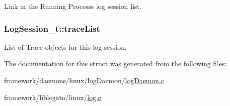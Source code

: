Link in the Running Process\textquotesingle{}s log session list. 

\subsubsection[{\texorpdfstring{trace\+List}{traceList}}]{ Log\+Session\+\_\+t\+::trace\+List}\hypertarget{struct_log_session__t_a2ca5fa6e4005f1b06f3c6f07f7f1e3dc}{}\label{struct_log_session__t_a2ca5fa6e4005f1b06f3c6f07f7f1e3dc}


List of Trace objects for this log session. 



The documentation for this struct was generated from the following files\+:\begin{DoxyCompactItemize}
\item 
framework/daemons/linux/log\+Daemon/\hyperlink{log_daemon_8c}{log\+Daemon.\+c}\item 
framework/liblegato/linux/\hyperlink{log_8c}{log.\+c}\end{DoxyCompactItemize}
